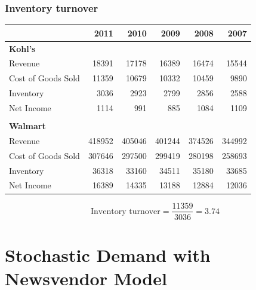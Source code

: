 \documentclass[10pt,handout,notes=show]{beamer}
\begin{document}
  \begin{frame}
  \frametitle{Inventory turnover}

  \begin{center}\small{
    \begin{tabular}{lrrrrr}\hline
      	                  & 2011	& 2010	& 2009	& 2008	& 2007 \\ \hline
      \textbf{Kohl's} \\
      Revenue	            & 18391	& 17178	& 16389	& 16474	& 15544 \\
      Cost of Goods Sold	& 11359	& 10679	& 10332	& 10459	& 9890\\
      Inventory	          & 3036	& 2923	& 2799	& 2856	& 2588 \\
      Net Income	        & 1114	& 991	& 885	& 1084	& 1109 \\ \hline
      	& 	& 	& 	& 	& \\
      \textbf{Walmart} \\
      Revenue	            & 418952	& 405046	& 401244	& 374526	& 344992\\
      Cost of Goods Sold	& 307646	& 297500	& 299419	& 280198	& 258693\\
      Inventory	          & 36318	  & 33160	  & 34511	& 35180	& 33685 \\
      Net Income	        & 16389	  & 14335	  & 13188	& 12884	& 12036 \\ \hline
    \end{tabular} }
  \end{center}

  \[
  \mbox{Inventory turnover} = \frac{11359}{3036} = 3.74
  \]
  \end{frame}

\section[NewsVendor]{Stochastic Demand with Newsvendor Model}
\end{document}
